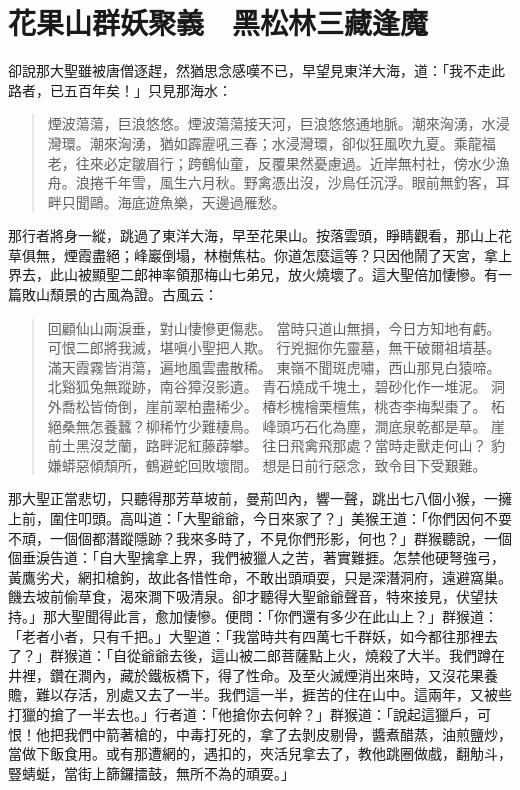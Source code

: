 
\chapter{花果山群妖聚義　黑松林三藏逢魔}

卻說那大聖雖被唐僧逐趕，然猶思念感嘆不已，早望見東洋大海，道：「我不走此路者，已五百年矣！」只見那海水：
\begin{quote}
煙波蕩蕩，巨浪悠悠。煙波蕩蕩接天河，巨浪悠悠通地脈。潮來洶湧，水浸灣環。潮來洶湧，猶如霹靂吼三春；水浸灣環，卻似狂風吹九夏。乘龍福老，往來必定皺眉行；跨鶴仙童，反覆果然憂慮過。近岸無村社，傍水少漁舟。浪捲千年雪，風生六月秋。野禽憑出沒，沙鳥任沉浮。眼前無釣客，耳畔只聞鷗。海底遊魚樂，天邊過雁愁。
\end{quote}

那行者將身一縱，跳過了東洋大海，早至花果山。按落雲頭，睜睛觀看，那山上花草俱無，煙霞盡絕；峰巖倒塌，林樹焦枯。你道怎麼這等？只因他鬧了天宮，拿上界去，此山被顯聖二郎神率領那梅山七弟兄，放火燒壞了。這大聖倍加悽慘。有一篇敗山頹景的古風為證。古風云：
\begin{quote}
回顧仙山兩淚垂，對山悽慘更傷悲。
當時只道山無損，今日方知地有虧。
可恨二郎將我滅，堪嗔小聖把人欺。
行兇掘你先靈墓，無干破爾祖墳基。
滿天霞霧皆消蕩，遍地風雲盡散稀。
東嶺不聞斑虎嘯，西山那見白猿啼。
北谿狐兔無蹤跡，南谷獐沒影遺。
青石燒成千塊土，碧砂化作一堆泥。
洞外喬松皆倚倒，崖前翠柏盡稀少。
椿杉槐檜栗檀焦，桃杏李梅梨棗了。
柘絕桑無怎養蠶？柳稀竹少難棲鳥。
峰頭巧石化為塵，澗底泉乾都是草。
崖前土黑沒芝蘭，路畔泥紅藤薜攀。
往日飛禽飛那處？當時走獸走何山？
豹嫌蟒惡傾頹所，鶴避蛇回敗壞間。
想是日前行惡念，致令目下受艱難。
\end{quote}

那大聖正當悲切，只聽得那芳草坡前，曼荊凹內，響一聲，跳出七八個小猴，一擁上前，圍住叩頭。高叫道：「大聖爺爺，今日來家了？」美猴王道：「你們因何不耍不頑，一個個都潛蹤隱跡？我來多時了，不見你們形影，何也？」群猴聽說，一個個垂淚告道：「自大聖擒拿上界，我們被獵人之苦，著實難捱。怎禁他硬弩強弓，黃鷹劣犬，網扣槍鉤，故此各惜性命，不敢出頭頑耍，只是深潛洞府，遠避窩巢。饑去坡前偷草食，渴來澗下吸清泉。卻才聽得大聖爺爺聲音，特來接見，伏望扶持。」那大聖聞得此言，愈加悽慘。便問：「你們還有多少在此山上？」群猴道：「老者小者，只有千把。」大聖道：「我當時共有四萬七千群妖，如今都往那裡去了？」群猴道：「自從爺爺去後，這山被二郎菩薩點上火，燒殺了大半。我們蹲在井裡，鑽在澗內，藏於鐵板橋下，得了性命。及至火滅煙消出來時，又沒花果養贍，難以存活，別處又去了一半。我們這一半，捱苦的住在山中。這兩年，又被些打獵的搶了一半去也。」行者道：「他搶你去何幹？」群猴道：「說起這獵戶，可恨！他把我們中箭著槍的，中毒打死的，拿了去剝皮剔骨，醬煮醋蒸，油煎鹽炒，當做下飯食用。或有那遭網的，遇扣的，夾活兒拿去了，教他跳圈做戲，翻觔斗，豎蜻蜓，當街上篩鑼擂鼓，無所不為的頑耍。」

